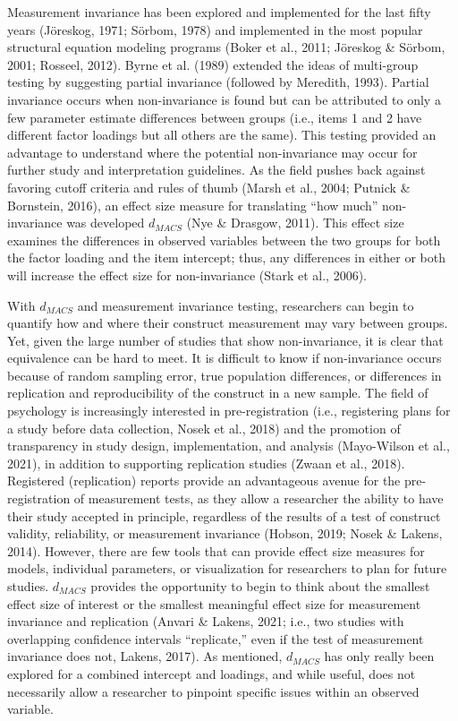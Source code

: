 \documentclass[
  man]{apa7}
\begin{document}
Measurement invariance has been explored and implemented for the last fifty years (Jöreskog, 1971; Sörbom, 1978) and implemented in the most popular structural equation modeling programs (Boker et al., 2011; Jöreskog \& Sörbom, 2001; Rosseel, 2012). Byrne et al. (1989) extended the ideas of multi-group testing by suggesting partial invariance (followed by Meredith, 1993). Partial invariance occurs when non-invariance is found but can be attributed to only a few parameter estimate differences between groups (i.e., items 1 and 2 have different factor loadings but all others are the same). This testing provided an advantage to understand where the potential non-invariance may occur for further study and interpretation guidelines. As the field pushes back against favoring cutoff criteria and rules of thumb (Marsh et al., 2004; Putnick \& Bornstein, 2016), an effect size measure for translating ``how much'' non-invariance was developed \(d_{MACS}\) (Nye \& Drasgow, 2011). This effect size examines the differences in observed variables between the two groups for both the factor loading and the item intercept; thus, any differences in either or both will increase the effect size for non-invariance (Stark et al., 2006).

With \(d_{MACS}\) and measurement invariance testing, researchers can begin to quantify how and where their construct measurement may vary between groups. Yet, given the large number of studies that show non-invariance, it is clear that equivalence can be hard to meet. It is difficult to know if non-invariance occurs because of random sampling error, true population differences, or differences in replication and reproducibility of the construct in a new sample. The field of psychology is increasingly interested in pre-registration (i.e., registering plans for a study before data collection, Nosek et al., 2018) and the promotion of transparency in study design, implementation, and analysis (Mayo-Wilson et al., 2021), in addition to supporting replication studies (Zwaan et al., 2018). Registered (replication) reports provide an advantageous avenue for the pre-registration of measurement tests, as they allow a researcher the ability to have their study accepted in principle, regardless of the results of a test of construct validity, reliability, or measurement invariance (Hobson, 2019; Nosek \& Lakens, 2014). However, there are few tools that can provide effect size measures for models, individual parameters, or visualization for researchers to plan for future studies. \(d_{MACS}\) provides the opportunity to begin to think about the smallest effect size of interest or the smallest meaningful effect size for measurement invariance and replication (Anvari \& Lakens, 2021; i.e., two studies with overlapping confidence intervals ``replicate,'' even if the test of measurement invariance does not, Lakens, 2017). As mentioned, \(d_{MACS}\) has only really been explored for a combined intercept and loadings, and while useful, does not necessarily allow a researcher to pinpoint specific issues within an observed variable.
\end{document}
